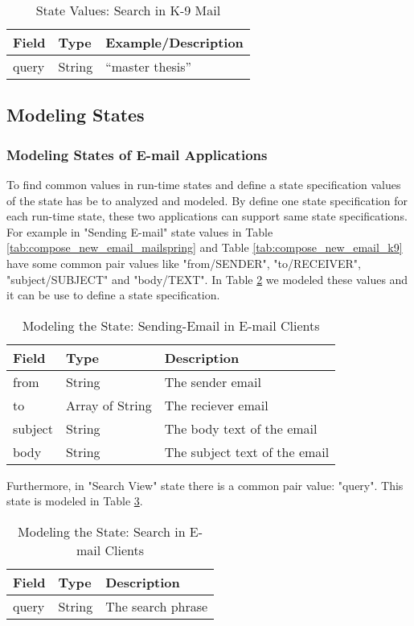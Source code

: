 \FloatBarrier \begin{table}[H]
\centering
\begin{tabular}{lll}
Field & Type   & Example/Description \\
\hline
query & String & “master thesis”    
\end{tabular}
\caption{State Values: Search in K-9 Mail}
\label{tab:search_k9}
\end{table} \FloatBarrier


\subsection{Modeling States}
\subsubsection{Modeling States of E-mail Applications}
To find common values in run-time states and define a state specification values of the state has be to analyzed and modeled. By define one state specification for each run-time state, these two applications can support same state specifications. For example in "Sending E-mail" state values in Table \ref{tab:compose_new_email_mailspring} and Table \ref{tab:compose_new_email_k9} have some common pair values like "from/SENDER", "to/RECEIVER", "subject/SUBJECT" and "body/TEXT". In Table \ref{tab:email-model} we modeled these values and it can be use to define a state specification. 


\FloatBarrier\FloatBarrier \begin{table}[H]
\centering
\begin{tabular}{lll}
Field   & Type   & Description                    \\ 
\hline
from    & String & The sender email               \\
to      & Array of String  & The reciever email             \\
subject & String & The body text of the email     \\
body    & String & The subject text of the email 
\end{tabular}
\caption{Modeling the State: Sending-Email in E-mail Clients}
\label{tab:email-model}
\end{table} \FloatBarrier


Furthermore, in "Search View" state there is a common pair value: "query". This state is modeled in Table \ref{tab:search-model}.


\FloatBarrier
\begin{table}[H]
\centering
\begin{tabular}{lll}
Field & Type   & Description        \\ 
\hline
query & String & The search phrase 
\end{tabular}
\caption{Modeling the State: Search in E-mail Clients}
\label{tab:search-model}
\end{table}
\FloatBarrier